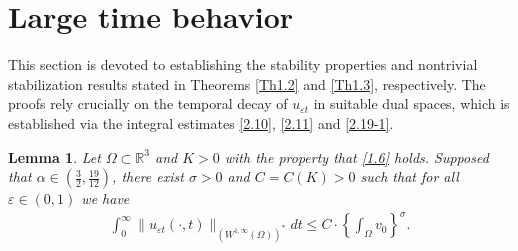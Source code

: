 \documentclass[12pt]{article}
\theoremstyle{plain}
\newtheorem{lemma}{Lemma}[section]
\theoremstyle{definition}
\numberwithin{equation}{section}
\begin{document}
\section{Large time behavior }\label{sec:4}
This section is devoted to establishing the stability properties and nontrivial stabilization results stated in Theorems \ref{Th1.2} and \ref{Th1.3}, respectively. The proofs rely crucially on the   temporal decay of $u_{\varepsilon t}$ in suitable dual spaces, which  is established via the integral estimates \eqref{2.10}, \eqref{2.11} and \eqref{2.19-1}.
\begin{lemma}\label{lemma4.1}
Let $\Omega \subset \mathbb R^3$ and $K>0$ with the property that \eqref{1.6} holds. Supposed that
$\alpha\in\left(\frac{3}{2},\frac{19}{12}\right)$, there exist  $\sigma>0$ and $C=C(K)>0$ such that for all $\varepsilon\in(0,1)$ we have
\begin{align}\label{4.1}
   \int_0^{\infty}\|u_{\varepsilon t}(\cdot,t)\|_{(W^{1,\infty}(\Omega))^*}dt\leq C\cdot \left\{\int_{\Omega} v_{0}\right\}^{\sigma}.
\end{align}
\end{lemma}
\end{document}
